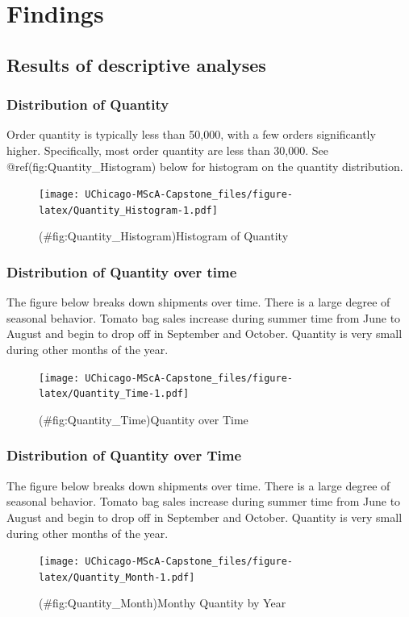 \documentclass[12pt,oneside]{chicagocapstone}
\begin{document}
\chapter*{Findings}\label{findings}

\section*{Results of descriptive analyses}\label{findings-descriptive}

\subsection{Distribution of Quantity}\label{distribution-of-quantity}

Order quantity is typically less than 50,000, with a few orders
significantly higher. Specifically, most order quantity are less than
30,000. See @ref(fig:Quantity\_Histogram) below for histogram on the
quantity distribution.
\begin{figure}
\centering
\texttt{[image: UChicago-MScA-Capstone\_files/figure-latex/Quantity\_Histogram-1.pdf]}
\caption{(\#fig:Quantity\_Histogram)Histogram of Quantity}
\end{figure}
\subsection{Distribution of Quantity over
time}\label{distribution-of-quantity-over-time}

The figure below breaks down shipments over time. There is a large
degree of seasonal behavior. Tomato bag sales increase during summer
time from June to August and begin to drop off in September and October.
Quantity is very small during other months of the year.
\begin{figure}
\centering
\texttt{[image: UChicago-MScA-Capstone\_files/figure-latex/Quantity\_Time-1.pdf]}
\caption{(\#fig:Quantity\_Time)Quantity over Time}
\end{figure}
\subsection{Distribution of Quantity over
Time}\label{distribution-of-quantity-over-time-1}

The figure below breaks down shipments over time. There is a large
degree of seasonal behavior. Tomato bag sales increase during summer
time from June to August and begin to drop off in September and October.
Quantity is very small during other months of the year.
\begin{figure}
\centering
\texttt{[image: UChicago-MScA-Capstone\_files/figure-latex/Quantity\_Month-1.pdf]}
\caption{(\#fig:Quantity\_Month)Monthy Quantity by Year}
\end{figure}
\end{document}
